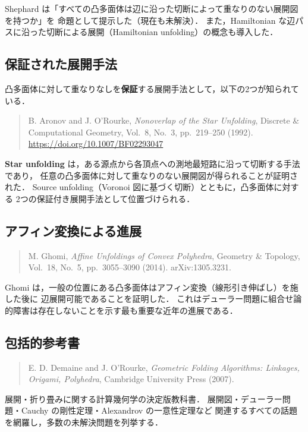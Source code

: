 \documentclass[a4paper,11pt]{article}
\begin{document}
Shephard は「すべての凸多面体は辺に沿った切断によって重なりのない展開図を持つか」を
命題として提示した（現在も未解決）．
また，Hamiltonian な辺パスに沿った切断による展開（Hamiltonian unfolding）の概念も導入した．

\subsection{保証された展開手法}

凸多面体に対して重なりなしを\textbf{保証}する展開手法として，以下の2つが知られている．

\begin{quotation}\noindent
  B. Aronov and J. O'Rourke,
  \textit{Nonoverlap of the Star Unfolding},
  Discrete \& Computational Geometry, Vol.~8, No.~3, pp.~219--250 (1992).
  \url{https://doi.org/10.1007/BF02293047}
\end{quotation}

\textbf{Star unfolding} は，ある源点から各頂点への測地最短路に沿って切断する手法であり，
任意の凸多面体に対して重なりのない展開図が得られることが証明された．
Source unfolding（Voronoi 図に基づく切断）とともに，凸多面体に対する
2つの保証付き展開手法として位置づけられる．

\subsection{アフィン変換による進展}

\begin{quotation}\noindent
  M. Ghomi,
  \textit{Affine Unfoldings of Convex Polyhedra},
  Geometry \& Topology, Vol.~18, No.~5, pp.~3055--3090 (2014).
  arXiv:1305.3231.
\end{quotation}

Ghomi は，一般の位置にある凸多面体はアフィン変換（線形引き伸ばし）を施した後に
辺展開可能であることを証明した．
これはデューラー問題に組合せ論的障害は存在しないことを示す最も重要な近年の進展である．

\subsection{包括的参考書}

\begin{quotation}\noindent
  E. D. Demaine and J. O'Rourke,
  \textit{Geometric Folding Algorithms: Linkages, Origami, Polyhedra},
  Cambridge University Press (2007).
\end{quotation}

展開・折り畳みに関する計算幾何学の決定版教科書．
展開図・デューラー問題・Cauchy の剛性定理・Alexandrov の一意性定理など
関連するすべての話題を網羅し，多数の未解決問題を列挙する．
\end{document}
